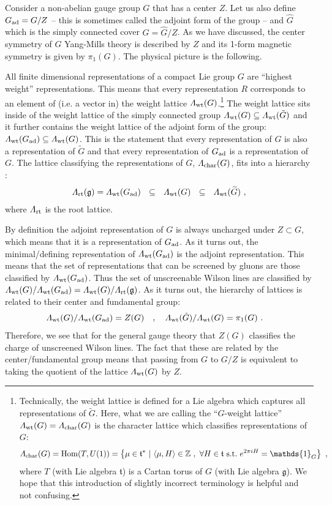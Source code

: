 \documentclass[11pt]{article}
\newcommand{\eq}[1]{\begin{align}\begin{split}#1\end{split}\end{align}}
\def\IZ{{\mathbb{Z}}}
\def\hatG{{\widehat{G}}}
\def\tildeG{{\tilde{G}}}
\def\fg{\mathfrak{g}}
\def\ft{\mathfrak{t}}
\def\ft{\mathfrak{t}}
\begin{document}
 Consider a non-abelian gauge group $G$ that has a center $Z$. Let us also define $G_{\rm ad}=G/Z$ -- this is sometimes called the adjoint form of the group   -- and $\hatG$ which is the simply connected cover $G=\hatG/Z$. As we have discussed, the   center symmetry of $G$ Yang-Mills theory is described by $Z$ and its 1-form magnetic symmetry is given by $\pi_1(G)$. The physical picture is the following. 
 
All finite dimensional representations of a compact Lie group $G$ are ``highest weight'' representations. This means that every representation $R$ corresponds to an element of (i.e. a vector in) the weight lattice $\Lambda_{\rm wt}(G)$.\footnote{Technically, the weight lattice is defined for a Lie algebra which captures all representations of $\tildeG$. Here, what we are calling the ``$G$-weight lattice''  
$\Lambda_{\rm wt}(G)=\Lambda_{\rm char}(G)$ is the character lattice which classifies representations of $G$: 
\eq{
\Lambda_{\rm char}(G)={\rm Hom}(T,U(1))=\left\{\mu \in \ft^\ast ~|~\langle\mu,H\rangle\in \IZ~,~\forall H\in \ft~{\rm s.t.}~e^{2\pi i H}=\mathds{1}_G\right\}~,
}
where $T$ (with Lie algebra $\ft$) is a Cartan torus of $G$ (with Lie algebra $\fg$).  
We hope that this introduction of slightly incorrect terminology is helpful and not confusing. 
} The weight lattice sits inside of the weight lattice of the simply connected group $\Lambda_{\rm wt}(G)\subseteq \Lambda_{\rm wt}(\tildeG)$ and it further contains the weight lattice of the adjoint form of the group: $\Lambda_{\rm wt}(G_{\rm ad})\subseteq \Lambda_{\rm wt}(G)$. This is the statement that every representation of $G$ is also a representation of $\tildeG$ and that every representation of $G_{\rm ad}$ is a representation of $G$. 
The lattice classifying the representations of $G$, $\Lambda_{\rm char}(G)$, fits into a hierarchy \cite{Moore:2014jfa}: 
\eq{
\Lambda_{\rm rt}(\fg)=\Lambda_{\rm wt}(G_{\rm ad})~~\subseteq~~ \Lambda_{\rm wt}(G)~~\subseteq~~  \Lambda_{\rm wt}(\widetilde{G})~,
}
where $\Lambda_{\rm rt}$ is the root lattice.

By definition the adjoint representation of $G$ is always uncharged under $Z\subset G$, which means that it is a representation of $G_{\rm ad}$. As it turns out, the minimal/defining representation of $\Lambda_{\rm wt}(G_{\rm ad})$ is the adjoint representation. This means that 
the set of representations that can be screened by gluons are those classified by $\Lambda_{\rm wt}(G_{\rm ad})$.  
 Thus the set of unscreenable Wilson lines are classified by $\Lambda_{\rm wt}(G)/\Lambda_{\rm wt}(G_{\rm ad})=\Lambda_{\rm wt}(G)/\Lambda_{\rm rt}(\fg)$. As it turns out, the hierarchy of lattices is related to their center and fundamental group:
\eq{
\Lambda_{\rm wt}(G)/\Lambda_{\rm wt}(G_{\rm ad})=Z(G)\quad&, \quad \Lambda_{\rm wt}(\tildeG)/\Lambda_{\rm wt}(G)=\pi_1(G)~.}
Therefore, we see that for the general gauge theory that $Z(G)$ classifies the charge of unscreened Wilson lines. The fact that these are related by the center/fundamental group means that passing from $G$ to $G/Z$ is equivalent to taking the quotient of the lattice $\Lambda_{\rm wt}(G)$ by $Z$. 
\end{document}
